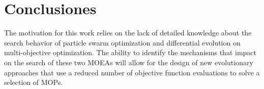 
\section{Conclusiones}

The motivation for this work relies on the lack of detailed knowledge about the search behavior of particle swarm optimization and differential evolution on multi-objective optimization. The ability to identify the mechanisms that impact on the search of these two MOEAs will allow for the design of new evolutionary approaches that use a reduced number of objective function evaluations to solve a selection of MOPs. 
